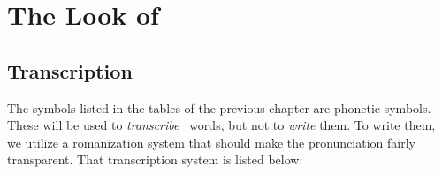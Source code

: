 
\chapter{The Look of \LanguageName}

\section{Transcription}

The symbols listed in the tables of the previous chapter are phonetic symbols.
These will be used to \emph{transcribe} \LanguageName\ words, but not to \emph{write} them.
To write them, we utilize a romanization system that should make the pronunciation fairly transparent.
That transcription system is listed below:


